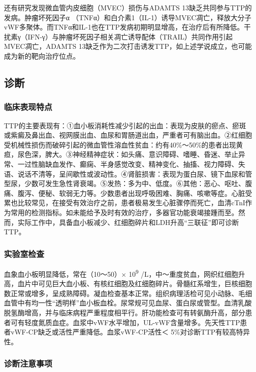 还有研究发现微血管内皮细胞（MVEC）损伤与ADAMTS
13缺乏共同参与TTP的发病。肿瘤坏死因子α
（TNFα）和白介素1（IL-1）诱导MVEC凋亡，释放大分子vWF多聚体。而TNFα和IL-1也在TTP发病初期明显增高，在治疗后有所降低。干扰素γ（IFN-γ）与肿瘤坏死因子相关凋亡诱导配体（TRAIL）共同作用引起MVEC凋亡，ADAMTS
13缺乏作为二次打击诱发TTP，如上述学说成立，也可能成为新的靶向治疗位点。

\subsection{诊断}

\subsubsection{临床表现特点}

TTP的主要表现有：①血小板消耗性减少引起的出血：表现为皮肤的瘀点、瘀斑或紫癜及鼻出血、视网膜出血、血尿和胃肠道出血，严重者可有脑出血。②红细胞受机械性损伤而破碎引起的微血管性溶血性贫血：约有40\%～50\%的患者出现黄疸，尿色深，脾大。③神经精神症状：如头痛、意识障碍、嗜睡、昏迷、举止异常、一过性脑缺血发作、癫痫、半身感觉改变、精神变化、抽搐、视力障碍、失语、说话不清等，呈间歇性或波动性。④肾脏损害：表现为蛋白尿、镜下血尿和管型尿，少数可发生急性肾衰竭。⑤发热：多为中、低度。⑥其他：恶心、呕吐、腹痛、腹泻、便秘、软弱无力等。少数患者出现呼吸困难、胸痛、咳嗽等症。心脏受累也比较常见，在接受有效治疗之前，患者极易发生心脏骤停而死亡，血清cTnI作为常用的检测指标。如未能给予及时有效的治疗，多器官功能衰竭接踵而至。然而，实际工作中，具备血小板减少、红细胞碎片和LDH升高“三联征”即可诊断TTP。

\subsubsection{实验室检查}

血象血小板明显降低，常在（10～50）× 10\textsuperscript{9}
/L，中～重度贫血，网织红细胞升高，血片中可见巨大血小板、有核红细胞及红细胞碎片。骨髓红系增生，巨核细胞数正常或增多，呈成熟障碍。凝血检查基本正常。组织病理活检可见小动脉、毛细血管中有均一性“透明样”血小板血栓。尿常规可见血尿、蛋白尿或管型。血清乳酸脱氢酶增高，并与临床病程严重程度相平行。肝功能检查可有转氨酶升高，部分患者可有轻度氮质血症。血浆中vWF水平增加，UL-vWF含量增多。先天性TTP患者vWF-CP缺乏或活性严重降低。血浆vWF-CP活性＜
5\%对诊断TTP有较高特异性。

\subsubsection{诊断注意事项}

